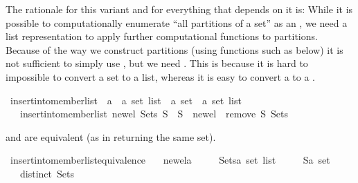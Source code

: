 \begin{isabellebody}
\begin{isamarkuptext}
   The rationale for this variant and for everything that depends on it is:
   While it is possible to computationally enumerate ``all partitions of a set'' as an
   , we need a list representation to apply further computational
   functions to partitions.  Because of the way we construct partitions (using functions
   such as  below) it is not sufficient to simply use 
   , but we need .  This is because it is hard 
   to impossible to convert a set to a list, whereas it is easy to convert a  to a .%
\end{isamarkuptext}%
\isamarkuptrue%
\isamarkupfalse%
\ insert{\isacharunderscore}into{\isacharunderscore}member{\isacharunderscore}list\ {\isacharcolon}{\isacharcolon}\ {\isachardoublequoteopen}{\isacharprime}a\ {\isasymRightarrow}\ {\isacharprime}a\ set\ list\ {\isasymRightarrow}\ {\isacharprime}a\ set\ {\isasymRightarrow}\ {\isacharprime}a\ set\ list{\isachardoublequoteclose}\isanewline
\ \ \ {\isachardoublequoteopen}insert{\isacharunderscore}into{\isacharunderscore}member{\isacharunderscore}list\ new{\isacharunderscore}el\ Sets\ S\ {\isacharequal}\ {\isacharparenleft}S\ {\isasymunion}\ {\isacharbraceleft}new{\isacharunderscore}el{\isacharbraceright}{\isacharparenright}\ {\isacharhash}\ {\isacharparenleft}remove{}\ S\ Sets{\isacharparenright}{\isachardoublequoteclose}%
\begin{isamarkuptext}%
 and  are equivalent
  (as in returning the same set).%
\end{isamarkuptext}%
\isamarkuptrue%
\isamarkupfalse%
\ insert{\isacharunderscore}into{\isacharunderscore}member{\isacharunderscore}list{\isacharunderscore}equivalence{\isacharcolon}\isanewline
\ \ \ new{\isacharunderscore}el{\isacharcolon}{\isacharcolon}{\isacharprime}a\isanewline
\ \ \ \ \ Sets{\isacharcolon}{\isacharcolon}{\isachardoublequoteopen}{\isacharprime}a\ set\ list{\isachardoublequoteclose}\isanewline
\ \ \ \ \ S{\isacharcolon}{\isacharcolon}{\isachardoublequoteopen}{\isacharprime}a\ set{\isachardoublequoteclose}\isanewline
\ \ \ {\isachardoublequoteopen}distinct\ Sets{\isachardoublequoteclose}\isanewline

\end{isabellebody}
